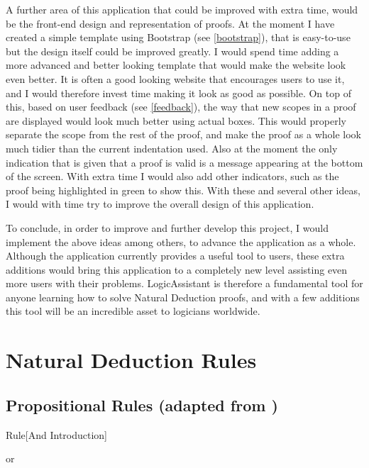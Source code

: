 A further area of this application that could be improved with extra time, would be the front-end design and representation of proofs. At the moment I have created a simple template using Bootstrap (see \ref{bootstrap}), that is easy-to-use but the design itself could be improved greatly. I would spend time adding a more advanced and better looking template that would make the website look even better. It is often a good looking website that encourages users to use it, and I would therefore invest time making it look as good as possible. On top of this, based on user feedback (see \ref{feedback}), the way that new scopes in a proof are displayed would look much better using actual boxes. This would properly separate the scope from the rest of the proof, and make the proof as a whole look much tidier than the current indentation used. Also at the moment the only indication that is given that a proof is valid is a message appearing at the bottom of the screen. With extra time I would also add other indicators, such as the proof being highlighted in green to show this. With these and several other ideas, I would with time try to improve the overall design of this application.

To conclude, in order to improve and further develop this project, I would implement the above ideas among others, to advance the application as a whole. Although the application currently provides a useful tool to users, these extra additions would bring this application to a completely new level assisting even more users with their problems. LogicAssistant is therefore a fundamental tool for anyone learning how to solve Natural Deduction proofs, and with a few additions this tool will be an incredible asset to logicians worldwide.

\pagebreak
\appendix
\section{Natural Deduction Rules}
\label{appendix:nd}

\subsection{Propositional Rules (adapted from \cite{ndBook})}
\label{appendix:nd-prop}


\begin{namedthm}{Rule}[And Introduction]

\begin{bprooftree}
\end{bprooftree}\qquad or \qquad
\begin{bprooftree}
\end{bprooftree}

\end{namedthm}

